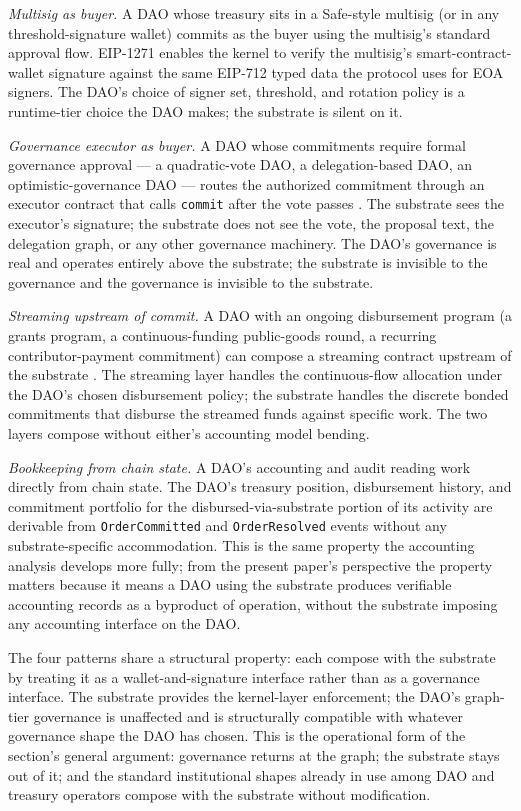 \documentclass[11pt,a4paper]{article}
\theoremstyle{remark}
\begin{document}
\emph{Multisig as buyer.} A DAO whose treasury sits in a Safe-style
multisig (or in any threshold-signature wallet) commits as the
buyer using the multisig's standard approval flow. EIP-1271
\citep{eip1271} enables the kernel to verify the multisig's
smart-contract-wallet signature against the same EIP-712 typed
data the protocol uses for EOA signers. The DAO's choice of
signer set, threshold, and rotation policy is a runtime-tier
choice the DAO makes; the substrate is silent on it.

\emph{Governance executor as buyer.} A DAO whose commitments
require formal governance approval --- a quadratic-vote DAO, a
delegation-based DAO, an optimistic-governance DAO --- routes the
authorized commitment through an executor contract that calls
\texttt{commit} after the vote passes
\citep{compound_governor_2020, openzeppelin_governor_2024}. The
substrate sees the executor's signature; the substrate does not
see the vote, the proposal text, the delegation graph, or any
other governance machinery. The DAO's governance is real and
operates entirely above the substrate; the substrate is invisible
to the governance and the governance is invisible to the
substrate.

\emph{Streaming upstream of commit.} A DAO with an ongoing
disbursement program (a grants program, a continuous-funding
public-goods round, a recurring contributor-payment commitment)
can compose a streaming contract upstream of the substrate
\citep{sablier_2023}. The streaming layer handles the
continuous-flow allocation under the DAO's chosen disbursement
policy; the substrate handles the discrete bonded commitments
that disburse the streamed funds against specific work. The two
layers compose without either's accounting model bending.

\emph{Bookkeeping from chain state.} A DAO's accounting and
audit reading work directly from chain state. The DAO's treasury
position, disbursement history, and commitment portfolio for the
disbursed-via-substrate portion of its activity are derivable
from \texttt{OrderCommitted} and \texttt{OrderResolved} events
without any substrate-specific accommodation. This is the same
property the accounting analysis develops more fully; from the
present paper's perspective the property matters because it
means a DAO using the substrate produces verifiable accounting
records as a byproduct of operation, without the substrate
imposing any accounting interface on the DAO.

The four patterns share a structural property: each compose with
the substrate by treating it as a wallet-and-signature interface
rather than as a governance interface. The substrate provides the
kernel-layer enforcement; the DAO's graph-tier governance is
unaffected and is structurally compatible with whatever
governance shape the DAO has chosen. This is the operational form
of the section's general argument: governance returns at the
graph; the substrate stays out of it; and the standard
institutional shapes already in use among DAO and treasury
operators \citep{messari_dao_treasury_2023, deepdao_treasury_2024}
compose with the substrate without modification.
\end{document}
